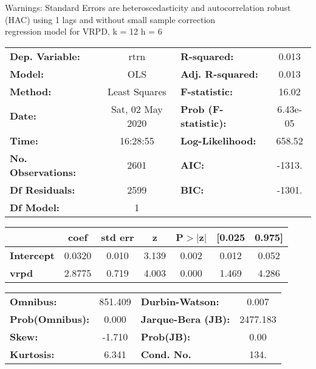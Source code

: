 Warnings: \newline
 [1] Standard Errors are heteroscedasticity and autocorrelation robust (HAC) using 1 lags and without small sample correction\\ 

regression model for VRPD, k = 12 h = 6\begin{center}
\begin{tabular}{lclc}
\toprule
\textbf{Dep. Variable:}    &       rtrn       & \textbf{  R-squared:         } &     0.013   \\
\textbf{Model:}            &       OLS        & \textbf{  Adj. R-squared:    } &     0.013   \\
\textbf{Method:}           &  Least Squares   & \textbf{  F-statistic:       } &     16.02   \\
\textbf{Date:}             & Sat, 02 May 2020 & \textbf{  Prob (F-statistic):} &  6.43e-05   \\
\textbf{Time:}             &     16:28:55     & \textbf{  Log-Likelihood:    } &    658.52   \\
\textbf{No. Observations:} &        2601      & \textbf{  AIC:               } &    -1313.   \\
\textbf{Df Residuals:}     &        2599      & \textbf{  BIC:               } &    -1301.   \\
\textbf{Df Model:}         &           1      & \textbf{                     } &             \\
\bottomrule
\end{tabular}
\begin{tabular}{lcccccc}
                   & \textbf{coef} & \textbf{std err} & \textbf{z} & \textbf{P$> |$z$|$} & \textbf{[0.025} & \textbf{0.975]}  \\
\midrule
\textbf{Intercept} &       0.0320  &        0.010     &     3.139  &         0.002        &        0.012    &        0.052     \\
\textbf{vrpd}      &       2.8775  &        0.719     &     4.003  &         0.000        &        1.469    &        4.286     \\
\bottomrule
\end{tabular}
\begin{tabular}{lclc}
\textbf{Omnibus:}       & 851.409 & \textbf{  Durbin-Watson:     } &    0.007  \\
\textbf{Prob(Omnibus):} &   0.000 & \textbf{  Jarque-Bera (JB):  } & 2477.183  \\
\textbf{Skew:}          &  -1.710 & \textbf{  Prob(JB):          } &     0.00  \\
\textbf{Kurtosis:}      &   6.341 & \textbf{  Cond. No.          } &     134.  \\
\bottomrule
\end{tabular}
\end{center}

